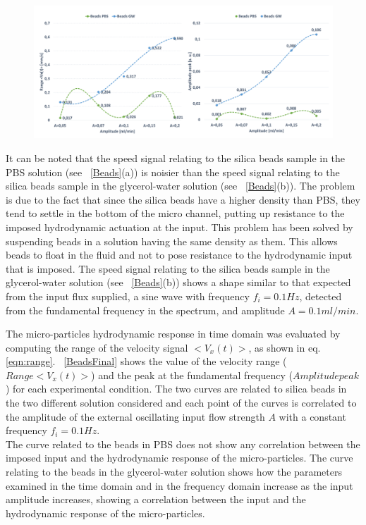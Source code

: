\documentclass[journal]{IEEEtran}
\theoremstyle{definition}
\theoremstyle{remark}
\begin{document}
\begin{figure}[h!]
	\centering
	\includegraphics[width=1\columnwidth]{images/BeadsFinal}
\end{figure}

It can be noted that the speed signal relating to the silica beads sample in the PBS solution (see ~\fig\ref{Beads}(a)) is noisier than the speed signal relating to the silica beads sample in the glycerol-water solution (see ~\fig\ref{Beads}(b)). The problem is due to the fact that since the silica beads have a higher density than PBS, they tend to settle in the bottom of the micro channel, putting up resistance to the imposed hydrodynamic actuation at the input. This problem has been solved by suspending beads in a solution having the same density as them. This allows beads to float in the fluid and not to pose resistance to the hydrodynamic input that is imposed. The speed signal relating to the silica beads sample in the glycerol-water solution (see ~\fig\ref{Beads}(b)) shows a shape similar to that expected from the input flux supplied, a sine wave with frequency $f_i= 0.1 Hz$, detected from the fundamental frequency in the spectrum, and amplitude $A={0.1 ml/min}$.


The micro-particles hydrodynamic response in time domain was evaluated by computing the range of the velocity signal $<V_x(t)>$, as shown in eq. \ref{eqn:range}. ~\fig\ref{BeadsFinal} shows the value of the velocity range ($Range<V_x(t)>$) and the peak at the fundamental frequency ($Amplitude peak$) for each experimental condition. The two curves are related to silica beads in the two different solution considered and each point of the curves is correlated to the amplitude of the external oscillating input flow strength $A$ with a constant frequency $f_i= 0.1 Hz$. 
\\The curve related to the beads in PBS does not show any correlation between the imposed input and the hydrodynamic response of the micro-particles. The curve relating to the beads in the glycerol-water solution shows how the parameters examined in the time domain and in the frequency domain increase as the input amplitude increases, showing a correlation between the input and the hydrodynamic response of the micro-particles.
\end{document}
